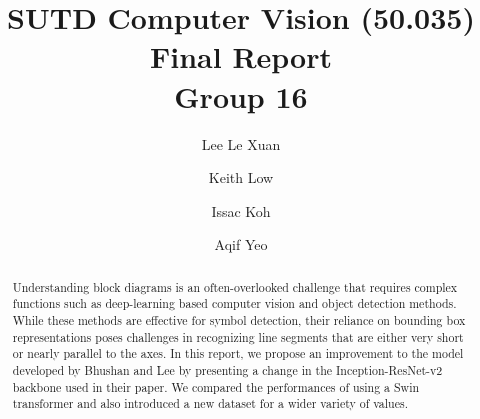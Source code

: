 \begin{frontmatter}
%
\title{%
SUTD Computer Vision (50.035) Final Report\\
\small Group 16  %
}
%
\author{Lee Le Xuan} 
\author{Keith Low}
\author{Issac Koh} 
\author{Aqif Yeo}
%
%
\renewcommand*{\today}{\MonthYearDateFormat\displaydate{dateName}} 
%
\begin{abstract}

Understanding block diagrams is an often-overlooked challenge that requires complex functions such as deep-learning based computer vision and object detection methods. While these methods are effective for symbol detection, their reliance on bounding box representations poses challenges in recognizing line segments that are either very short or nearly parallel to the axes. In this report, we propose an improvement to the model developed by Bhushan and Lee by presenting a change in the Inception-ResNet-v2 backbone used in their paper. We compared the performances of using a Swin transformer and also introduced a new dataset for a wider variety of values.

\end{abstract}
%
\end{frontmatter}
%
%
%

